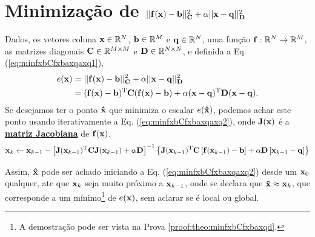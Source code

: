 \section{Minimização de $||\VECTOR{f}(\VECTOR{x})-\VECTOR{b}||_{\MATRIX{C}}^2+\alpha||\VECTOR{x}-\VECTOR{q}||_{\MATRIX{D}}^2$}



\begin{theorem}\label{theo:minfxbCfxbaxqaxq}
Dados,
os vetores coluna $\VECTOR{x}\in \mathbb{R}^N$, $\VECTOR{b}\in \mathbb{R}^M$ e $\VECTOR{q}\in \mathbb{R}^N$,  
uma função $\VECTOR{f}:\mathbb{R}^{N} \rightarrow \mathbb{R}^{M}$, 
as matrizes diagonais $\MATRIX{C} \in \mathbb{R}^{M\times M}$ e $\MATRIX{D} \in \mathbb{R}^{N\times N}$, e 
definida a Eq. (\ref{eq:minfxbCfxbaxqaxq1}),
\begin{align}\label{eq:minfxbCfxbaxqaxq1}
e(\VECTOR{x}) &=||\VECTOR{f}(\VECTOR{x})-\VECTOR{b}||_{\MATRIX{C}}^2+\alpha||\VECTOR{x}-\VECTOR{q}||_{\MATRIX{D}}^2\\
              & = (\VECTOR{f}(\VECTOR{x})-\VECTOR{b})^{\transpose}\MATRIX{C}(\VECTOR{f}(\VECTOR{x})-\VECTOR{b})+\alpha(\VECTOR{x}-\VECTOR{q})^{\transpose}\MATRIX{D}(\VECTOR{x}-\VECTOR{q}).
\end{align}
Se desejamos ter o ponto $\VECTOR{\hat{x}}$ que minimiza o escalar $e(\VECTOR{\hat{x}})$,
podemos achar este ponto usando iterativamente a Eq. (\ref{eq:minfxbCfxbaxqaxq2}),
onde  $\MATRIX{J}(\VECTOR{x})$ é a \hyperref[def:jacobian]{\textbf{matriz Jacobiana}}  de $\VECTOR{f}(\VECTOR{x})$.
\begin{equation}\label{eq:minfxbCfxbaxqaxq2}
\VECTOR{x}_{k}\leftarrow \VECTOR{x}_{k-1}-
\left[ \MATRIX{J}(\VECTOR{x}_{k-1})^{\transpose}\MATRIX{C} \MATRIX{J}(\VECTOR{x}_{k-1}) +\alpha\MATRIX{D} \right]^{-1}
 \left\{\MATRIX{J}(\VECTOR{x}_{k-1})^{\transpose}\MATRIX{C}\left[\VECTOR{f}(\VECTOR{x}_{k-1})-\VECTOR{b}\right]+\alpha\MATRIX{D}\left[\VECTOR{x}_{k-1}-\VECTOR{q}\right]\right\}
\end{equation}

Assim, $\VECTOR{\hat{x}}$ pode ser achado 
iniciando a Eq. (\ref{eq:minfxbCfxbaxqaxq2}) desde um $\VECTOR{x}_{0}$ qualquer, 
ate que $\VECTOR{x}_{k}$ seja muito próximo a $\VECTOR{x}_{k-1}$,
onde se declara que $\VECTOR{\hat{x}} \approx \VECTOR{x}_{k}$,
que corresponde a um mínimo\footnote{\label{ref:minfxxq}A
demostração pode ser vista na Prova \ref{proof:theo:minfxbCfxbaxqd}.} de $e(\VECTOR{x})$,
sem aclarar se é local ou global.



\end{theorem}
